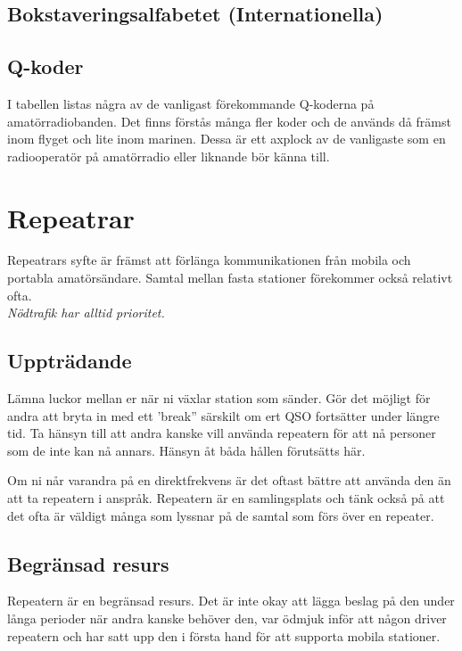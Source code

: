 \subsection{Bokstaveringsalfabetet (Internationella)}



\clearpage

\subsection{Q-koder}
I tabellen listas några av de vanligast förekommande Q-koderna på
amatörradiobanden.  Det finns förstås många fler koder och de används då
främst inom flyget och lite inom marinen. Dessa är ett axplock av de
vanligaste som en radiooperatör på amatörradio eller liknande bör känna till.



\section{Repeatrar}

Repeatrars syfte är främst att förlänga kommunikationen från mobila och
portabla amatörsändare. Samtal mellan fasta stationer förekommer också
relativt ofta.\\[1ex]

{\it \Large Nödtrafik har alltid prioritet.}

\subsection{Uppträdande}

Lämna luckor mellan er när ni växlar station som sänder. Gör det möjligt för
andra att bryta in med ett 'break'' särskilt om ert QSO fortsätter under
längre tid. Ta hänsyn till att andra kanske vill använda repeatern för att nå
personer som de inte kan nå annars. Hänsyn åt båda hållen förutsätts här.

Om ni når varandra på en direktfrekvens är det oftast bättre att använda den
än att ta repeatern i anspråk. Repeatern är en samlingsplats och tänk också på
att det ofta är väldigt många som lyssnar på de samtal som förs över en
repeater.

\subsection{Begränsad resurs}

Repeatern är en begränsad resurs. Det är inte okay att lägga beslag på den
under långa perioder när andra kanske behöver den, var ödmjuk inför att någon
driver repeatern och har satt upp den i första hand för att supporta mobila
stationer.

